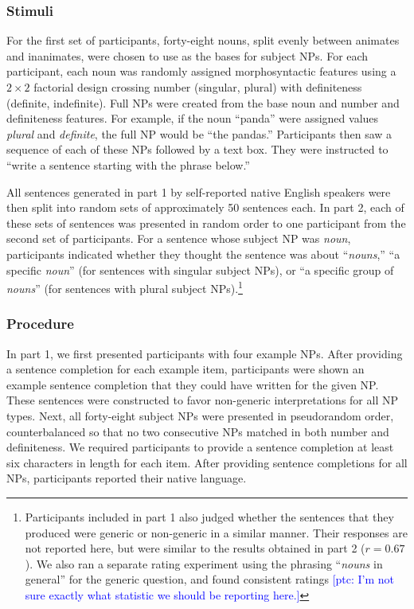 \documentclass[10pt,letterpaper]{article}
\newcommand{\ptc}[1]{\textcolor{Blue}{[ptc: #1]}}
\begin{document}
\subsubsection{Stimuli}

For the first set of participants, forty-eight nouns, split evenly between animates and inanimates, were chosen to use as the bases for subject NPs. For each participant, each noun was randomly assigned morphosyntactic features using a \(2 \times 2\) factorial design crossing number (singular, plural) with definiteness (definite, indefinite). Full NPs were created from the base noun and number and definiteness features. For example, if the noun ``panda'' were assigned values \textit{plural} and \textit{definite}, the full NP would be ``the pandas.'' Participants then saw a sequence of each of these NPs followed by a text box. They were instructed to ``write a sentence starting with the phrase below.''

All sentences generated in part 1 by self-reported native English speakers were then split into random sets of approximately 50 sentences each. In part 2, each of these sets of sentences was presented in random order to one participant from the second set of participants. For a sentence whose subject NP was \textit{noun}, participants indicated whether they thought the sentence was about ``\textit{nouns},'' ``a specific \textit{noun}'' (for sentences with singular subject NPs), or ``a specific group of \textit{nouns}'' (for sentences with plural subject NPs).\footnote{Participants included in part 1 also judged whether the sentences that they produced were generic or non-generic in a similar manner. Their responses are not reported here, but were similar to the results obtained in part 2 (\(r = 0.67\)). We also ran a separate rating experiment using the phrasing ``\textit{nouns} in general'' for the generic question, and found consistent ratings \ptc{I'm not sure exactly what statistic we should be reporting here.}}

\subsubsection{Procedure}

In part 1, we first presented participants with four example NPs. After providing a sentence completion for each example item, participants were shown an example sentence completion that they could have written for the given NP. These sentences were constructed to favor non-generic interpretations for all NP types. Next, all forty-eight subject NPs were presented in pseudorandom order, counterbalanced so that no two consecutive NPs matched in both number and definiteness. We required participants to provide a sentence completion at least six characters in length for each item. After providing sentence completions for all NPs, participants reported their native language.
\end{document}
